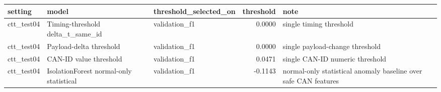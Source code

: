 \begin{tabular}{lllrl}
\toprule
setting & model & threshold\_selected\_on & threshold & note \\
\midrule
ctt\_test04 & Timing-threshold delta\_t\_same\_id & validation\_f1 & 0.0000 & single timing threshold \\
ctt\_test04 & Payload-delta threshold & validation\_f1 & 0.0000 & single payload-change threshold \\
ctt\_test04 & CAN-ID value threshold & validation\_f1 & 0.0471 & single CAN-ID numeric threshold \\
ctt\_test04 & IsolationForest normal-only statistical & validation\_f1 & -0.1143 & normal-only statistical anomaly baseline over safe CAN features \\
\bottomrule
\end{tabular}
